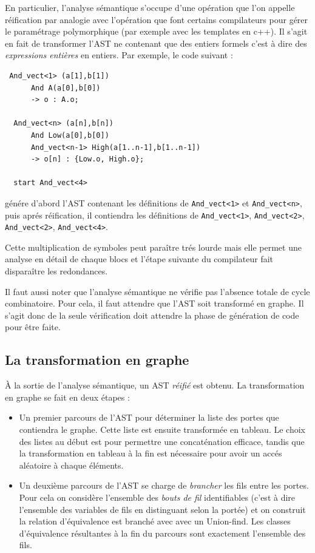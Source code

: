 \documentclass[13pt]{article}
\begin{document}
En particulier, l'analyse sémantique s'occupe d'une opération que l'on appelle
réification par analogie avec l'opération que font certains compilateurs pour
gérer le paramétrage polymorphique (par exemple avec les templates en c++). Il
s'agit en fait de transformer l'AST ne contenant que des entiers \og
formels\fg{} c'est à dire des \emph{expressions entières} en entiers.
Par exemple, le code suivant :
\begin{verbatim}
 And_vect<1> (a[1],b[1]) 
      And A(a[0],b[0])
      -> o : A.o;

  And_vect<n> (a[n],b[n])
      And Low(a[0],b[0])
      And_vect<n-1> High(a[1..n-1],b[1..n-1])
      -> o[n] : {Low.o, High.o};

  start And_vect<4>
\end{verbatim}

génére d'abord l'AST contenant les définitions de \texttt{And\_vect<1>} et
\texttt{And\_vect<n>}, puis aprés réification, il contiendra les définitions de
\texttt{And\_vect<1>}, \texttt{And\_vect<2>}, \texttt{And\_vect<2>},
\texttt{And\_vect<4>}. 

Cette multiplication de symboles peut paraître trés lourde mais elle permet une
analyse en détail de chaque blocs et l'étape suivante du compilateur fait
disparaître les redondances.

Il faut aussi noter que l'analyse sémantique ne vérifie pas l'absence totale de
cycle combinatoire. Pour cela, il faut attendre que l'AST soit transformé en
graphe. Il s'agit donc de la seule vérification doit attendre la phase de
génération de code pour être faite.

\subsection{La transformation en graphe}

À la sortie de l'analyse sémantique, un AST \emph{réifié} est obtenu. La
transformation en graphe se fait en deux étapes :
\begin{itemize}
\item Un premier parcours de l'AST pour déterminer la liste des portes
  que contiendra le graphe. Cette liste est ensuite transformée en tableau.
  Le choix des listes au début est pour permettre une concaténation efficace,
  tandis que la transformation en tableau à la fin est nécessaire pour avoir un
  accés aléatoire à chaque éléments.
\item Un deuxième parcours de l'AST se charge de \emph{brancher} les fils entre
  les portes. Pour cela on considère l'ensemble des \emph{bouts de fil} identifiables
  (c'est à dire l'ensemble des variables de fils en distinguant selon la portée)
  et on construit la relation d'équivalence \og est branché avec\fg{} avec un
  Union-find. Les classes d'équivalence résultantes à la fin du parcours sont
  exactement l'ensemble des fils.
\end{itemize}
\end{document}
